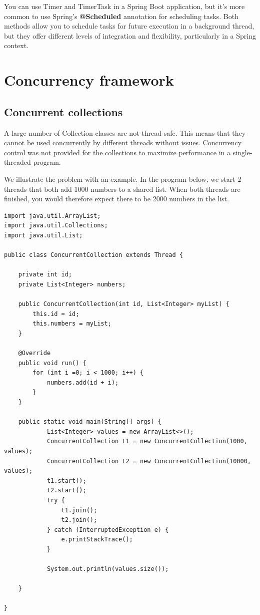 You can use Timer and TimerTask in a Spring Boot application, but it's more common to use Spring's \textbf{@Scheduled} annotation for scheduling tasks. Both methods allow you to schedule tasks for future execution in a background thread, but they offer different levels of integration and flexibility, particularly in a Spring context.

\section{Concurrency framework}

\subsection{Concurrent collections}

A large number of Collection classes are not thread-safe. This means that they cannot be used concurrently by different threads without issues.
Concurrency control was not provided for the collections to maximize performance in a single-threaded program.

We illustrate the problem with an example. In the program below, we start 2 threads that both add 1000 numbers to a shared list. When both threads are finished, you would therefore expect there to be 2000 numbers in the list.

\begin{lstlisting}
import java.util.ArrayList;
import java.util.Collections;
import java.util.List;

public class ConcurrentCollection extends Thread {

	private int id;
	private List<Integer> numbers;

	public ConcurrentCollection(int id, List<Integer> myList) {
		this.id = id;
		this.numbers = myList;
	}

	@Override
	public void run() {
		for (int i =0; i < 1000; i++) {
			numbers.add(id + i);
		}
	}

	public static void main(String[] args) {
			List<Integer> values = new ArrayList<>();
			ConcurrentCollection t1 = new ConcurrentCollection(1000, values);
			ConcurrentCollection t2 = new ConcurrentCollection(10000, values);
			t1.start();
			t2.start();
			try {
				t1.join();
				t2.join();
			} catch (InterruptedException e) {
				e.printStackTrace();
			}

			System.out.println(values.size());

	}

}
\end{lstlisting}


